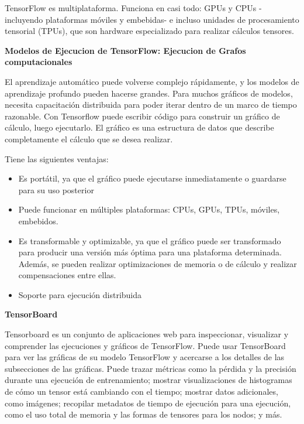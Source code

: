 TensorFlow es multiplataforma. Funciona en casi todo: GPUs y CPUs -incluyendo plataformas móviles y embebidas- e incluso unidades de procesamiento tensorial (TPUs), que son hardware especializado para realizar cálculos tensores.

\textbf{Modelos de Ejecucion de TensorFlow: Ejecucion de Grafos computacionales }

El aprendizaje automático puede volverse complejo rápidamente, y los modelos de aprendizaje profundo pueden hacerse grandes. Para muchos gráficos de modelos, necesita capacitación distribuida para poder iterar dentro de un marco de tiempo razonable. 
Con Tensorflow puede escribir código para construir un gráfico de cálculo, luego ejecutarlo. El gráfico es una estructura de datos que describe completamente el cálculo que se desea realizar.

Tiene las siguientes ventajas:

  \begin{itemize}
  
  \item{ }Es portátil, ya que el gráfico puede ejecutarse inmediatamente o guardarse para su uso posterior

  \item{ }Puede funcionar en múltiples plataformas: CPUs, GPUs, TPUs, móviles, embebidos. 
  		
  \item{ }Es transformable y optimizable, ya que el gráfico puede ser transformado para producir una versión más óptima para una plataforma determinada. Además, se pueden realizar optimizaciones de memoria o de cálculo y realizar compensaciones entre ellas.  
  		 
   \item{ }Soporte para ejecución distribuida

  \end{itemize}
  
\textbf{TensorBoard}

Tensorboard es un conjunto de aplicaciones web para inspeccionar, visualizar y comprender las ejecuciones y gráficos de TensorFlow. Puede usar TensorBoard para ver las gráficas de su modelo TensorFlow y acercarse a los detalles de las subsecciones de las gráficas.
Puede trazar métricas como la pérdida y la precisión durante una ejecución de entrenamiento; mostrar visualizaciones de histogramas de cómo un tensor está cambiando con el tiempo; mostrar datos adicionales, como imágenes; recopilar metadatos de tiempo de ejecución para una ejecución, como el uso total de memoria y las formas de tensores para los nodos; y más.

